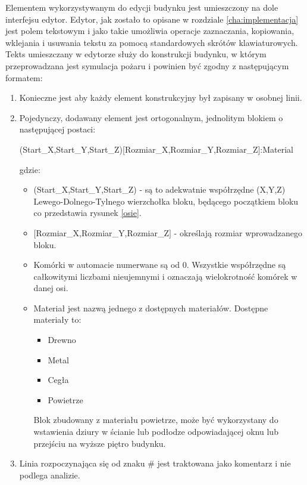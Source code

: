 Elementem wykorzystywanym do edycji budynku jest umieszczony na dole interfejsu edytor.
Edytor, jak zostało to opisane w rozdziale \ref{cha:implementacja} jest polem tekstowym i jako takie umożliwia
 operacje zaznaczania, kopiowania, wklejania i usuwania tekstu za pomocą standardowych skrótów klawiaturowych.
 Tekts umieszczany w edytorze służy do konstrukcji budynku, w którym przeprowadzana jest symulacja pożaru i powinien być zgodny z następującym formatem:
 \begin{enumerate}
 \item Konieczne jest aby każdy element konstrukcyjny był zapisany w osobnej linii.
 \item Pojedynczy, dodawany element jest ortogonalnym, jednolitym blokiem o następującej postaci:
 \begin{center}
	(Start\_X,Start\_Y,Start\_Z)[Rozmiar\_X,Rozmiar\_Y,Rozmiar\_Z]:Material
 \end {center}
 gdzie:
	 \begin{itemize}
	 \item (Start\_X,Start\_Y,Start\_Z) - są to adekwatnie współrzędne (X,Y,Z) Lewego-Dolnego-Tylnego wierzchołka bloku, będącego początkiem bloku co przedstawia rysunek \ref{osie}. 
	 \item $[$Rozmiar\_X,Rozmiar\_Y,Rozmiar\_Z$]$ - określają rozmiar wprowadzanego bloku. 
	 \item Komórki w automacie numerwane są od 0. Wszystkie współrzędne są całkowitymi liczbami nieujemnymi i oznaczają wielokrotność komórek w danej osi.
	 \item Materiał jest nazwą jednego z dostępnych materiałów. Dostępne materiały to:
	 \begin {itemize}
	 \item Drewno
	 \item Metal
	 \item Cegła
	 \item Powietrze
	 \end {itemize}
	 Blok zbudowany z materiału powietrze, może być wykorzystany do wstawienia dziury w ścianie lub podłodze odpowiadającej oknu lub przejściu na wyższe piętro budynku.
	 \end{itemize}
\item Linia rozpoczynająca się od znaku # jest traktowana jako komentarz i nie podlega analizie.
 \end {enumerate}
